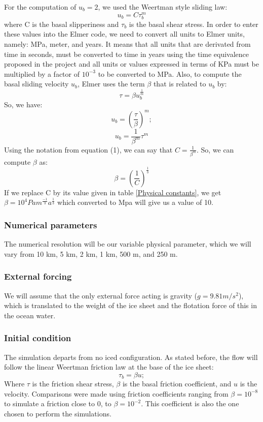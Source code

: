 \documentclass{article}
\begin{document}
For the computation of $u_b=2$, we used the Weertman style sliding law:
\begin{equation}
	u_b = C\tau _b^m
\end{equation}
where C is the basal slipperiness and $\tau _b$ is the basal shear stress.
In order to enter these values into the Elmer code, we need to convert all units to Elmer units, namely: MPa, meter, and years. It means that all units that are derivated from time in seconds, must be converted to time in years using the time equivalence proposed in the project and all units or values expressed in terms of KPa must be multiplied by a factor of $10^{-3}$ to be converted to MPa.
Also, to compute the basal sliding velocity $u_b$, Elmer uses the term $\beta$ that is related to $u_b$ by:
\begin{equation}
	\tau = \beta u_b^{\frac{1}{m}}
\end{equation}
So, we have:
\begin{equation}
	u_b = (\frac{\tau}{\beta})^m;
\end{equation}
\begin{equation}
	u_b = \frac{1}{\beta^m} \tau^m
\end{equation}
Using the notation from equation (1), we can say that $C=  \frac{1}{\beta^m}$. So, we can compute $\beta$ as:
\begin{equation}
	\beta=(\frac{1}{C})^{\frac{1}{3}}
\end{equation}
If we replace C by its value given in table \ref{Physical constants}, we get $\beta= 10^4 Pa m^{\frac{-1}{3}} a^{\frac{1}{3}}$ which converted to Mpa will give us a value of 10.

\subsubsection{Numerical parameters}
The numerical resolution will be our variable physical parameter, which we will vary from 10 km, 5 km, 2 km, 1 km, 500 m, and 250 m. 
\subsubsection{External forcing}
We will assume that the only external force acting is gravity ($g=9.81 m/s^2$), which is translated to the weight of the ice sheet and the flotation force of this in the ocean water.
\subsubsection{Initial condition}
The simulation departs from no iced configuration. 
As stated before, the flow will follow the linear Weertman friction law at the base of the ice sheet:
\begin{equation}
	\tau_b=\beta u;
\end{equation}
Where $\tau$ is the friction shear stress, $\beta$ is the basal friction coefficient, and $u$ is the velocity.
Comparisons were made using friction coefficients ranging from $\beta=10^{-8}$ to simulate a friction close to 0, to $\beta=10^{-2}$. This coefficient is also the one chosen to perform the simulations. 
\end{document}
